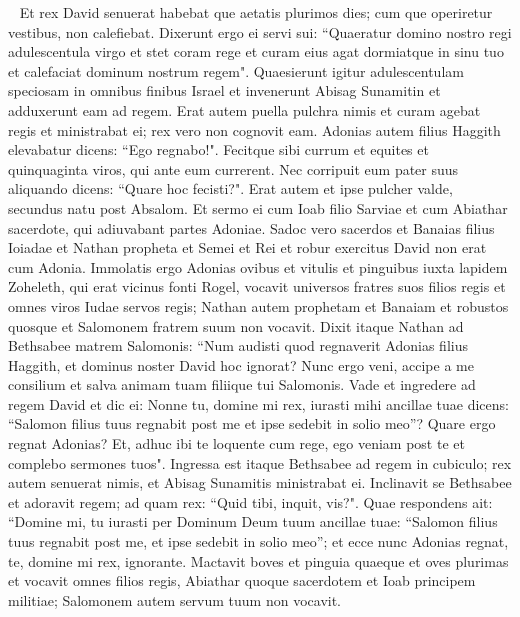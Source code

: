
\begin{biblechapter}   
\verse Et rex David senuerat habebat que aetatis plurimos dies; cum que operiretur vestibus, non calefiebat. 
\verse Dixerunt ergo ei servi sui: “Quaeratur domino nostro regi adulescentula virgo et stet coram rege et curam eius agat dormiatque in sinu tuo et calefaciat dominum nostrum regem". 
\verse Quaesierunt igitur adulescentulam speciosam in omnibus finibus Israel et invenerunt Abisag Sunamitin et adduxerunt eam ad regem. 
\verse Erat autem puella pulchra nimis et curam agebat regis et ministrabat ei; rex vero non cognovit eam. 
\verse Adonias autem filius Haggith elevabatur dicens: “Ego regnabo!". Fecitque sibi currum et equites et quinquaginta viros, qui ante eum currerent. 
\verse Nec corripuit eum pater suus aliquando dicens: “Quare hoc fecisti?". Erat autem et ipse pulcher valde, secundus natu post Absalom. 
\verse Et sermo ei cum Ioab filio Sarviae et cum Abiathar sacerdote, qui adiuvabant partes Adoniae. 
\verse Sadoc vero sacerdos et Banaias filius Ioiadae et Nathan propheta et Semei et Rei et robur exercitus David non erat cum Adonia. 
\verse Immolatis ergo Adonias ovibus et vitulis et pinguibus iuxta lapidem Zoheleth, qui erat vicinus fonti Rogel, vocavit universos fratres suos filios regis et omnes viros Iudae servos regis; 
\verse Nathan autem prophetam et Banaiam et robustos quosque et Salomonem fratrem suum non vocavit. 
\verse Dixit itaque Nathan ad Bethsabee matrem Salomonis: “Num audisti quod regnaverit Adonias filius Haggith, et dominus noster David hoc ignorat? 
\verse Nunc ergo veni, accipe a me consilium et salva animam tuam filiique tui Salomonis. 
\verse Vade et ingredere ad regem David et dic ei: Nonne tu, domine mi rex, iurasti mihi ancillae tuae dicens: “Salomon filius tuus regnabit post me et ipse sedebit in solio meo”? Quare ergo regnat Adonias? 
\verse Et, adhuc ibi te loquente cum rege, ego veniam post te et complebo sermones tuos". 
\verse Ingressa est itaque Bethsabee ad regem in cubiculo; rex autem senuerat nimis, et Abisag Sunamitis ministrabat ei. 
\verse Inclinavit se Bethsabee et adoravit regem; ad quam rex: “Quid tibi, inquit, vis?". 
\verse Quae respondens ait: “Domine mi, tu iurasti per Dominum Deum tuum ancillae tuae: “Salomon filius tuus regnabit post me, et ipse sedebit in solio meo”; 
\verse et ecce nunc Adonias regnat, te, domine mi rex, ignorante. 
\verse Mactavit boves et pinguia quaeque et oves plurimas et vocavit omnes filios regis, Abiathar quoque sacerdotem et Ioab principem militiae; Salomonem autem servum tuum non vocavit. 

\end{biblechapter}
